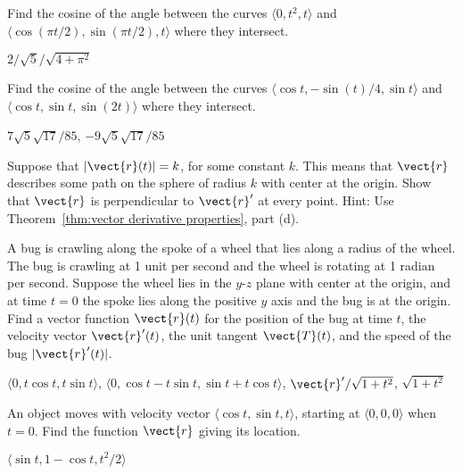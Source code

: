 \begin{enumialphparenastyle}
\begin{ex}
Find the cosine of the angle between the curves $\langle
0,t^2,t\rangle$ and $\langle \cos(\pi t/2),\sin(\pi t/2), t\rangle$
where they intersect.
\begin{sol} $2/\sqrt5/\sqrt{4+\pi^2}$
\end{sol}
\end{ex}

\begin{ex}
Find the cosine of the angle between the curves $\langle
\cos t,-\sin(t)/4,\sin t\rangle$ and $\langle \cos t,\sin t, \sin(2t)\rangle$
where they intersect.
\begin{sol} $7\sqrt{5}\sqrt{17}/85$, $-9\sqrt{5}\sqrt{17}/85$
\end{sol}
\end{ex}

\begin{ex}\label{ex:derivative is perpendicular}
Suppose that $|\vect{r}(t)|=k$, for some constant $k$. This
means that $\vect{r}$ describes some path on the sphere of radius $k$
with center at the origin. Show that $\vect{r}$ is perpendicular to $\vect{r}'$ at every point. Hint: Use Theorem~\ref{thm:vector derivative properties}, part (d).
\end{ex}

\begin{ex}
A bug is crawling along the spoke of a wheel that lies along
a radius of the wheel. The bug is crawling at 1 unit per second and
the wheel is rotating at 1 radian per second. Suppose the wheel lies
in the $y$-$z$ plane with center at the origin, and at time $t=0$ the
spoke lies along the positive $y$ axis and the bug is at the origin. 
Find a vector function $\vect{r}(t)$
for the position of the bug at time $t$, the velocity vector
$\vect{r}'(t)$, the unit tangent $\vect{T}(t)$, and the speed of the bug
$|\vect{r}'(t)|$.
\begin{sol} $\langle 0,t\cos t,t\sin t\rangle$, 
$\langle 0,\cos t-t\sin t,\sin t+t\cos t\rangle$,
$\vect{r}'/\sqrt{1+t^2}$, $\sqrt{1+t^2}$
\end{sol}
\end{ex}

\begin{ex}
An object moves with velocity vector $\langle \cos t, \sin t,
t\rangle$, starting at $\langle 0,0,0\rangle$ when $t=0$. Find the function
$\vect{r}$ giving its location.
\begin{sol} $\langle \sin t,1-\cos t,t^2/2\rangle$
\end{sol}
\end{ex}


\end{enumialphparenastyle}
